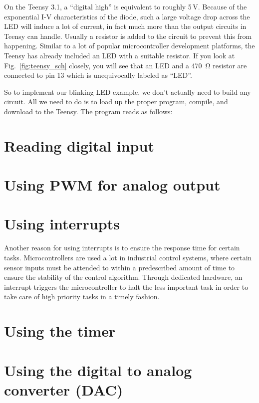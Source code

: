 \documentclass[letterpaper, 11pt]{article}
\begin{document}
On the Teensy 3.1, a ``digital high'' is equivalent to roughly 5\,V. Because of the exponential I-V characteristics of the diode, such a large voltage drop across the LED will induce a lot of current, in fact much more than the output circuits in Teensy can handle. Usually a resistor is added to the circuit to prevent this from happening. Similar to a lot of popular microcontroller development platforms, the Teensy has already included an LED with a suitable resistor. If you look at Fig.~\ref{fig:teensy_sch} closely, you will see that an LED and a \SI{470}{\ohm} resistor are connected to pin 13 which is unequivocally labeled as ``LED''. 

So to implement our blinking LED example, we don't actually need to build any circuit. All we need to do is to load up the proper program, compile, and download to the Teensy. The program reads as follows: 


\section{Reading digital input}

\section{Using PWM for analog output}

\section{Using interrupts}

Another reason for using interrupts is to ensure the response time for certain tasks. Microcontrollers are used a lot in industrial control systems, where certain sensor inputs must be attended to within a predescribed amount of time to ensure the stability of the control algorithm. Through dedicated hardware, an interrupt triggers the microcontroller to halt the less important task in order to take care of high priority tasks in a timely fashion.

\section{Using the timer}

\section{Using the digital to analog converter (DAC)}
\end{document}
